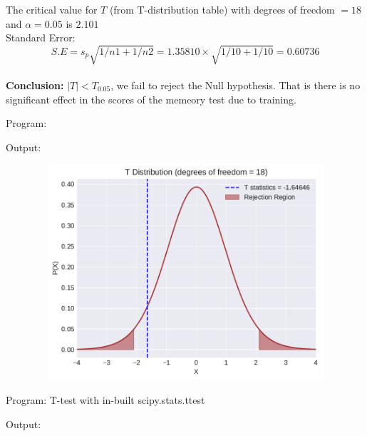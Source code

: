 \documentclass[a4paper,11pt,openright]{report}
\begin{document}
\begin{enumerate}
The critical value for $T$ (from T-distribution table) with degrees of freedom $= 18$ and 
$\alpha = 0.05$ is $2.101$ \\

Standard Error:
\begin{equation*}
S.E = s_{p} \sqrt{1/n1 + 1/n2} = 1.35810 \times \sqrt{1/10 + 1/10} = 0.60736
\end{equation*} \\

\textbf{Conclusion:} $|T| < T_{0.05}$, we fail to reject the Null hypothesis. That is there is
no significant effect in the scores of the memeory test due to training.

\pagebreak

Program:


\vspace{1cm}

Output:


\begin{figure}[ht!]
\includegraphics[width=16cm,height=8cm,keepaspectratio]{tscript3.pdf}
\centering
\end{figure}

\vspace{2cm}

Program: T-test with in-built scipy.stats.ttest


\vspace{1cm}

Output:



\end{enumerate}
\end{document}
